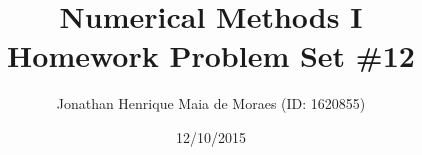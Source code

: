\title{Numerical Methods I \\ Homework Problem Set \#12}
\author{Jonathan Henrique Maia de Moraes (ID: 1620855)}
\date{12/10/2015}
\maketitle
